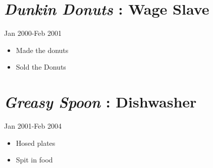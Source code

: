 \documentclass[]{article}
\begin{document}
\ifpdf
{}
\else
{}
\fi



\section*{\textit{Dunkin Donuts}
 : \textbf{Wage Slave}
}
  \label{_dunkindonuts
_wageslave
}
  \textsf{Jan 2000-Feb 2001}
      

\begin{itemize}
    \item Made the donuts
    \item Sold the Donuts
\end{itemize}
       
\section*{\textit{Greasy Spoon}
 : \textbf{Dishwasher}
}
  \label{_greasyspoon
_dishwasher
}
  \textsf{Jan 2001-Feb 2004}
      

\begin{itemize}
    \item Hosed plates
    \item Spit in food
\end{itemize}
       
\end{document}
